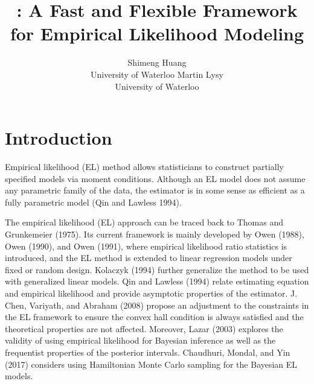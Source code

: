 \documentclass[article]{jss}
\author{
Shimeng Huang\\University of Waterloo \And Martin Lysy\\University of Waterloo
}
\title{\pkg{flexEL}: A Fast and Flexible Framework for Empirical Likelihood Modeling}
\renewcommand{\|}{\,|\,}
\begin{document}
\maketitle

% 
\hypertarget{introduction}{%
\section{Introduction}\label{introduction}}

Empirical likelihood (EL) method allows statisticians to construct partially specified models via moment conditions. Although an EL model does not assume any parametric family of the data, the estimator is in some sense as efficient as a fully parametric model (Qin and Lawless 1994).

The empirical likelihood (EL) approach can be traced back to Thomas and Grunkemeier (1975). Its current framework is mainly developed by Owen (1988), Owen (1990), and Owen (1991), where empirical likelihood ratio statistics is introduced, and the EL method is extended to linear regression models under fixed or random design. Kolaczyk (1994) further generalize the method to be used with generalized linear models. Qin and Lawless (1994) relate estimating equation and empirical likelihood and provide asymptotic properties of the estimator. J. Chen, Variyath, and Abraham (2008) propose an adjustment to the constraints in the EL framework to ensure the convex hall condition is always satisfied and the theoretical properties are not affected. Moreover, Lazar (2003) explores the validity of using empirical likelihood for Bayesian inference as well as the frequentist properties of the posterior intervals. Chaudhuri, Mondal, and Yin (2017) considers using Hamiltonian Monte Carlo sampling for the Bayesian EL models.
\end{document}
